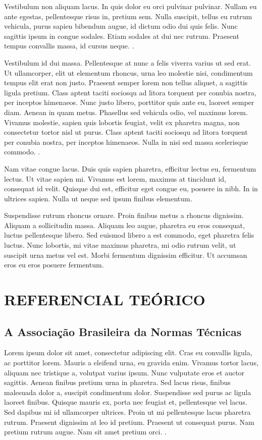 \documentclass[12pt,a4paper]{article}
\begin{document}
Vestibulum non aliquam lacus. In quis dolor eu orci pulvinar pulvinar. Nullam eu ante egestas, pellentesque risus in, pretium sem. Nulla suscipit, tellus eu rutrum vehicula, purus sapien bibendum augue, id dictum odio dui quis felis. Nunc sagittis ipsum in congue sodales. Etiam sodales at dui nec rutrum. Praesent tempus convallis massa, id cursus neque. \cite{nbr10520_2023, nbr14724_2024, nbr6023_2025}.

Vestibulum id dui massa. Pellentesque at nunc a felis viverra varius ut sed erat. Ut ullamcorper, elit ut elementum rhoncus, urna leo molestie nisi, condimentum tempus elit erat non justo. Praesent semper lorem non tellus aliquet, a sagittis ligula pretium. Class aptent taciti sociosqu ad litora torquent per conubia nostra, per inceptos himenaeos. Nunc justo libero, porttitor quis ante eu, laoreet semper diam. Aenean in quam metus. Phasellus sed vehicula odio, vel maximus lorem. Vivamus molestie, sapien quis lobortis feugiat, velit ex pharetra magna, non consectetur tortor nisl ut purus. Class aptent taciti sociosqu ad litora torquent per conubia nostra, per inceptos himenaeos. Nulla in nisi sed massa scelerisque commodo. \cite{lamport1994, mittelbach2004}.

Nam vitae congue lacus. Duis quis sapien pharetra, efficitur lectus eu, fermentum lectus. Ut vitae sapien mi. Vivamus est lorem, maximus at tincidunt id, consequat id velit. Quisque dui est, efficitur eget congue eu, posuere in nibh. In in ultrices sapien. Nulla ut neque sed ipsum finibus elementum. 

Suspendisse rutrum rhoncus ornare. Proin finibus metus a rhoncus dignissim. Aliquam a sollicitudin massa. Aliquam leo augue, pharetra eu eros consequat, luctus pellentesque libero. Sed euismod libero a est commodo, eget pharetra felis luctus. Nunc lobortis, mi vitae maximus pharetra, mi odio rutrum velit, ut suscipit urna metus vel est. Morbi fermentum dignissim efficitur. Ut accumsan eros eu eros posuere fermentum.

\clearpage %
\section{REFERENCIAL TEÓRICO}
\label{referencial}

\subsection{A Associação Brasileira da Normas Técnicas}
Lorem ipsum dolor sit amet, consectetur adipiscing elit. Cras eu convallis ligula, ac porttitor lorem. Mauris a eleifend urna, eu gravida enim. Vivamus tortor lacus, aliquam nec tristique a, volutpat varius ipsum. Nunc vulputate eros et auctor sagittis. Aenean finibus pretium urna in pharetra. Sed lacus risus, finibus malesuada dolor a, suscipit condimentum dolor. Suspendisse sed purus ac ligula laoreet finibus. Quisque mauris ex, porta nec feugiat et, pellentesque vel lacus. Sed dapibus mi id ullamcorper ultrices. Proin ut mi pellentesque lacus pharetra rutrum. Praesent dignissim at leo id pretium. Praesent ut consequat purus. Nam pretium rutrum augue. Nam sit amet pretium orci. \cite{abnt2024}. 
\end{document}
